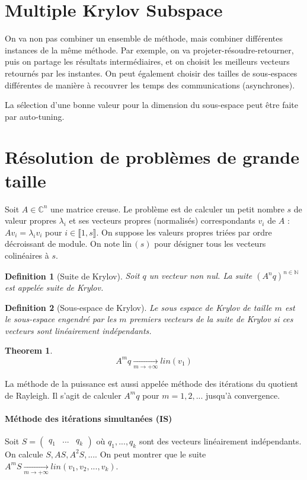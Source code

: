 \documentclass{article}
\newtheorem{thm}{Theorem}
\newtheorem{defi}{Definition}
\newcommand{\lin}{\text{lin}\,}
\begin{document}
\section{Multiple Krylov Subspace}
On va non pas combiner un ensemble de méthode, mais combiner différentes instances de la même méthode. Par exemple, on va projeter-résoudre-retourner, puis on partage les résultats intermédiaires, et on choisit les meilleurs vecteurs retournés par les instantes. On peut également choisir des tailles de sous-espaces différentes de manière à recouvrer les temps des communications (asynchrones).

La sélection d'une bonne valeur pour la dimension du sous-espace peut être faite par auto-tuning.


\section{Résolution de problèmes de grande taille}
Soit $A\in \mathbb{C}^n$ une matrice creuse. Le problème est de calculer un petit nombre $s$ de valeur propres $\lambda_i$ et ses vecteurs propres (normalisés) correspondants $v_i$ de $A$ : $Av_i = \lambda_i v_i$ pour $i\in \llbracket 1,s \rrbracket$. On suppose les valeurs propres triées par ordre décroissant de module. On note $\lin (s)$ pour désigner tous les vecteurs colinéaires à $s$.

\begin{defi}[Suite de Krylov]
Soit $q$ un vecteur non nul. La suite $(A^nq)^{n \in \mathbb{N}}$ est appelée suite de Krylov.
\end{defi}

\begin{defi}[Sous-espace de Krylov]
Le sous espace de Krylov de taille $m$ est le sous-espace engendré par les $m$ premiers vecteurs de la suite de Krylov si ces vecteurs sont linéairement indépendants.
\end{defi}

\begin{thm}
\[ A^m q \underset{m \to + \infty}{\longrightarrow} lin(v_1)\]
\end{thm}

La méthode de la puissance est aussi appelée méthode des itérations du quotient de Rayleigh. Il s'agit de calculer $A^m q$ pour $m = 1, 2, ...$ jusqu'à convergence.


\paragraph{Méthode des itérations simultanées (IS)}
Soit $S= \begin{pmatrix} q_1 & ... &q_k \end{pmatrix}$ où $q_1,..., q_k$ sont des vecteurs linéairement indépendants. On calcule $S, AS, A^2S, ...$. On peut montrer que le suite $A^mS \underset{m\to +\infty}{\longrightarrow} lin(v_1,v_2,...,v_k)$.
\end{document}
